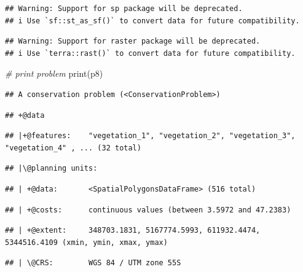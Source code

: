 \documentclass[
  12pt,
]{book}
\newenvironment{Shaded}{\begin{snugshade}}{\end{snugshade}}
\newcommand{\CommentTok}[1]{\textcolor[rgb]{0.56,0.35,0.01}{\textit{#1}}}
\newcommand{\FunctionTok}[1]{\textcolor[rgb]{0.00,0.00,0.00}{#1}}
\newcommand{\NormalTok}[1]{#1}
\begin{document}
\begin{verbatim}
## Warning: Support for sp package will be deprecated.
## i Use `sf::st_as_sf()` to convert data for future compatibility.
\end{verbatim}

\begin{verbatim}
## Warning: Support for raster package will be deprecated.
## i Use `terra::rast()` to convert data for future compatibility.
\end{verbatim}

\clearpage

\begin{Shaded}
\begin{Highlighting}[]
\CommentTok{\# print problem}
\FunctionTok{print}\NormalTok{(p8)}
\end{Highlighting}
\end{Shaded}

\begin{verbatim}
## A conservation problem (<ConservationProblem>)
\end{verbatim}

\begin{verbatim}
## +@data
\end{verbatim}

\begin{verbatim}
## |+@features:    "vegetation_1", "vegetation_2", "vegetation_3", "vegetation_4" , ... (32 total)
\end{verbatim}

\begin{verbatim}
## |\@planning units:
\end{verbatim}

\begin{verbatim}
## | +@data:       <SpatialPolygonsDataFrame> (516 total)
\end{verbatim}

\begin{verbatim}
## | +@costs:      continuous values (between 3.5972 and 47.2383)
\end{verbatim}

\begin{verbatim}
## | +@extent:     348703.1831, 5167774.5993, 611932.4474, 5344516.4109 (xmin, ymin, xmax, ymax)
\end{verbatim}

\begin{verbatim}
## | \@CRS:        WGS 84 / UTM zone 55S
\end{verbatim}
\end{document}
